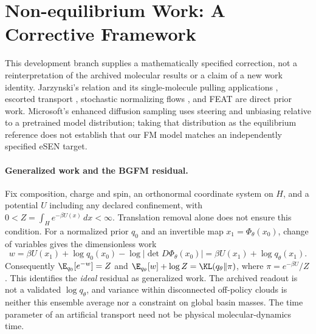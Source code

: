 \section{Non-equilibrium Work: A Corrective Framework}
\label{app:nonequilibrium}

This development branch supplies a mathematically specified correction, not a
reinterpretation of the archived molecular results or a claim of a new work
identity. Jarzynski's relation and its single-molecule pulling applications
\citep{jarzynski1997master,hummerszabo2001}, escorted transport
\citep{escorted2008}, stochastic normalizing flows \citep{snf2020}, and FEAT
\citep{feat2025} are direct prior work. Microsoft's enhanced diffusion sampling
\citep{enhanceddiffusion2026} uses steering and unbiasing relative to a pretrained
model distribution; taking that distribution as the equilibrium reference does
not establish that our FM model matches an independently specified eSEN target.

\paragraph{Generalized work and the BGFM residual.}
Fix composition, charge and spin, an orthonormal coordinate system on $H$, and
a potential $U$ including any declared confinement, with
$0<Z=\int_H e^{-\beta U(x)}\,dx<\infty$. Translation removal alone does not
ensure this condition. For a normalized prior $q_0$ and an invertible map
$x_1=\Phi_\theta(x_0)$, change of variables gives the dimensionless work
\begin{equation}
w=\beta U(x_1)+\log q_0(x_0)-\log|\det D\Phi_\theta(x_0)|
 =\beta U(x_1)+\log q_\theta(x_1).
\end{equation}
Consequently $\E_{q_0}[e^{-w}]=Z$ and
$\E_{q_\theta}[w]+\log Z=\KL(q_\theta\Vert\pi)$, where
$\pi=e^{-\beta U}/Z$. This identifies the \emph{ideal} residual as generalized
work. The archived readout is not a validated $\log q_\theta$, and variance
within disconnected off-policy clouds is neither this ensemble average nor a
constraint on global basin masses. The time parameter of an artificial
transport need not be physical molecular-dynamics time.

